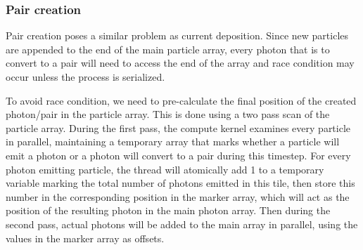 \subsubsection{Pair creation}
\label{sec:gpu-pair}

Pair creation poses a similar problem as current deposition. Since new particles
are appended to the end of the main particle array, every photon that is to
convert to a pair will need to access the end of the array and race condition
may occur unless the process is serialized.

To avoid race condition, we need to pre-calculate the final position of the
created photon/pair in the particle array. This is done using a two pass scan of
the particle array. During the first pass, the compute kernel examines every
particle in parallel, maintaining a temporary array that marks whether a
particle will emit a photon or a photon will convert to a pair during this
timestep. For every photon emitting particle, the thread will atomically add 1
to a temporary variable marking the total number of photons emitted in this
tile, then store this number in the corresponding position in the marker array,
which will act as the position of the resulting photon in the main photon array.
Then during the second pass, actual photons will be added to the main array in
parallel, using the values in the marker array as offsets.

